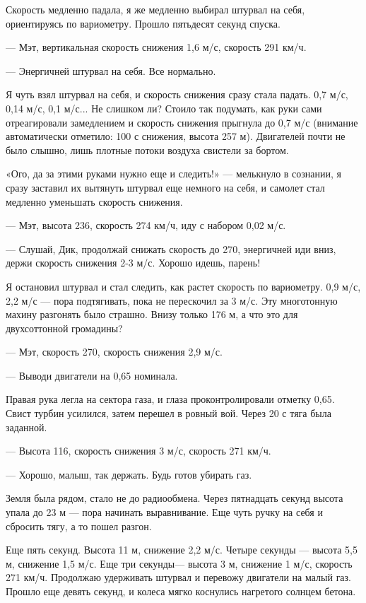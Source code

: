 \documentclass[11pt,a4paper,oneside]{article}
\begin{document}
Скорость медленно падала, я же медленно выбирал штурвал на себя, ориентируясь по вариометру. Прошло пятьдесят секунд спуска.

— Мэт, вертикальная скорость снижения 1,6 м/с, скорость 291 км/ч.

— Энергичней штурвал на себя. Все нормально.

Я чуть взял штурвал на себя, и скорость снижения сразу стала падать. 0,7 м/с, 0,14 м/с, 0,1 м/с... Не слишком ли? Стоило так подумать, как руки сами отреагировали замедлением и скорость снижения прыгнула до 0,7 м/с (внимание автоматически отметило: 100 с снижения, высота 257 м). Двигателей почти не было слышно, лишь плотные потоки воздуха свистели за бортом.

«Ого, да за этими руками нужно еще и следить!» — мелькнуло в сознании, я сразу заставил их вытянуть штурвал еще немного на себя, и самолет стал медленно уменьшать скорость снижения.

— Мэт, высота 236, скорость 274 км/ч, иду с набором 0,02 м/с.

— Слушай, Дик, продолжай снижать скорость до 270, энергичней иди вниз, держи скорость снижения 2-3 м/с. Хорошо идешь, парень!

Я остановил штурвал и стал следить, как растет скорость по вариометру. 0,9 м/с, 2,2 м/с — пора подтягивать, пока не перескочил за 3 м/с. Эту многотонную махину разгонять было страшно. Внизу только 176 м, а что это для двухсоттонной громадины?

— Мэт, скорость 270, скорость снижения 2,9 м/с.

— Выводи двигатели на 0,65 номинала.

Правая рука легла на сектора газа, и глаза проконтролировали отметку 0,65. Свист турбин усилился, затем перешел в ровный вой. Через 20 с тяга была заданной.

— Высота 116, скорость снижения 3 м/с, скорость 271 км/ч.

— Хорошо, малыш, так держать. Будь готов убирать газ.

Земля была рядом, стало не до радиообмена. Через пятнадцать секунд высота упала до 23 м — пора начинать выравнивание. Еще чуть ручку на себя и сбросить тягу, а то пошел разгон.

Еще пять секунд. Высота 11 м, снижение 2,2 м/с. Четыре секунды — высота 5,5 м, снижение 1,5 м/с. Еще три секунды— высота 3 м, снижение 1 м/с, скорость 271 км/ч. Продолжаю удерживать штурвал и перевожу двигатели на малый газ. Прошло еще девять секунд, и колеса мягко коснулись нагретого солнцем бетона.
\end{document}
